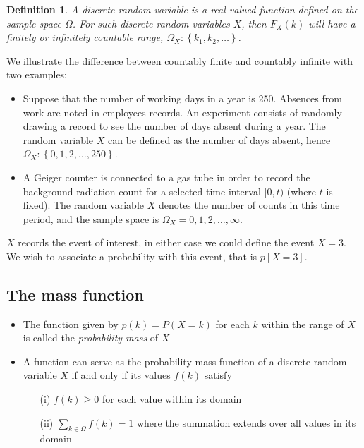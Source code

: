 \documentclass[12pt]{extbook}
\newtheorem{df}{Definition}[section]
\begin{document}
\begin{df}
A \emph{discrete} random variable is a real valued function defined on the
sample space $\Omega$.  For such discrete random variables $X$, then
$F_X(k)$ will have a finitely or infinitely countable range,
$\Omega_X: \left\{ k_1, k_2, \ldots \right\}$.
\end{df}


We illustrate the difference between countably finite and countably
infinite with two examples:

\begin{itemize}
\item Suppose that the number of working days in a year is 250.   Absences
from work are noted in employees records.   An experiment consists of
randomly drawing a record to see the number of days absent during a
year.   The random variable $X$ can be defined as the number of days
absent, hence $\Omega_X: \left\{ 0,1,2,\ldots,250 \right\}$.  

\item A Geiger counter is connected to a gas tube in order to record the
background radiation count for a selected time interval $[0,t)$ (where
$t$ is fixed).   The random variable $X$ denotes the number of counts
in this time period, and the sample space is $\Omega_X=0,1,2,\ldots,\infty$.
\end{itemize}


$X$ records the event of interest, in either case we could define the
event $X=3$.   We wish to associate a probability with this event,
that is $p[X=3]$.



\subsection{The mass function}

\begin{itemize}
\item The function given by $p(k) = P(X=k)$ for each $k$ within the range of $X$ is called the \emph{probability mass} of $X$
\item A function can serve as the probability mass function of a discrete random variable $X$ if and only if its values $f(k)$ satisfy
\begin{itemize}
\item[(i)] $f(k) \geq 0$ for each value within its domain
\item[(ii)] $\sum_{k \in \Omega} f(k) = 1$ where the summation extends over all values in its domain
\end{itemize}
\end{itemize}
\end{document}
